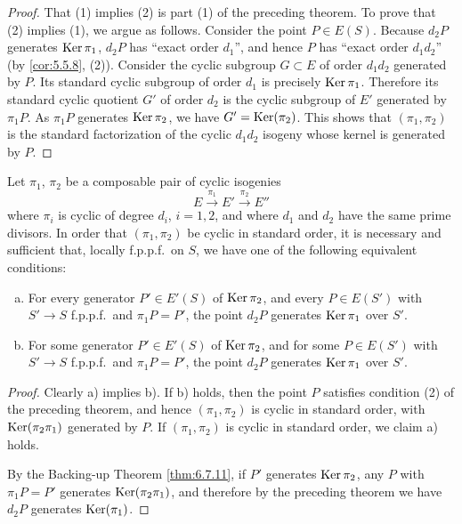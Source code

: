 \begin{proof}
That (1) implies (2) is part (1) of the preceding theorem. To prove that (2) implies (1), we argue as follows. Consider the point $P \in E(S)$. Because $d_2P$ generates $\operatorname{Ker} \pi_1$, $d_2P$ has ``exact order $d_1$'', and hence $P$ has ``exact order $d_1d_2$'' (by \ref{cor:5.5.8}, (2)). Consider the cyclic subgroup $G \subset E$ of order $d_1d_2$ generated by $P$. Its standard cyclic subgroup of order $d_1$ is precisely $\operatorname{Ker} \pi_1$. Therefore its standard cyclic quotient $G'$ of order $d_2$ is the cyclic subgroup of $E'$ generated by $\pi_1P$. As $\pi_1P$ generates $\operatorname{Ker} \pi_2$, we have $G' = \operatorname{Ker}(\pi_2)$. This shows that $(\pi_1,\pi_2)$ is the standard factorization of the cyclic $d_1d_2$ isogeny whose kernel is generated by $P$.
\end{proof}

\begin{stdorder}\label{thm:6.7.13}
Let $\pi_1$, $\pi_2$ be a composable pair of cyclic isogenies
\[
E \xrightarrow{\pi_1} E' \xrightarrow{\pi_2} E''
\]
where $\pi_i$ is cyclic of degree $d_i$, $i = 1,2$, and where $d_1$ and $d_2$ have the same prime divisors. In order that $(\pi_1,\pi_2)$ be cyclic in standard order, it is necessary and sufficient that, locally f.p.p.f.\ on $S$, we have one of the following equivalent conditions:
\begin{enumerate}[a)]
\item For every generator $P' \in E'(S)$ of $\operatorname{Ker} \pi_2$, and every $P \in E(S')$ with $S' \to S$ f.p.p.f.\ and $\pi_1P = P'$, the point $d_2P$ generates $\operatorname{Ker} \pi_1$ over $S'$.
\item For some generator $P' \in E'(S)$ of $\operatorname{Ker} \pi_2$, and for some $P \in E(S')$ with $S' \to S$ f.p.p.f.\ and $\pi_1P = P'$, the point $d_2P$ generates $\operatorname{Ker} \pi_1$ over $S'$.
\end{enumerate}
\end{stdorder}

\begin{proof}
Clearly a) implies b). If b) holds, then the point $P$ satisfies condition (2) of the preceding theorem, and hence $(\pi_1,\pi_2)$ is cyclic in standard order, with $\operatorname{Ker}(\pi_2\pi_1)$ generated by $P$. If $(\pi_1,\pi_2)$ is cyclic in standard order, we claim a) holds.

By the Backing-up Theorem \ref{thm:6.7.11}, if $P'$ generates $\operatorname{Ker} \pi_2$, any $P$ with $\pi_1P = P'$ generates $\operatorname{Ker}(\pi_2\pi_1)$, and therefore by the preceding theorem we have $d_2P$ generates $\operatorname{Ker}(\pi_1)$.
\end{proof}

